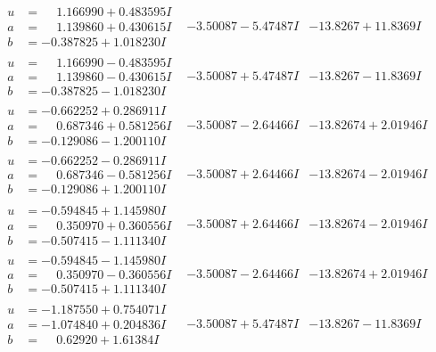 \documentclass[1p]{elsarticle_modified}
\theoremstyle{definition}
\begin{document}
$$\begin{array}{c|c|c}
\begin{aligned}
u &= \phantom{-}1.166990 + 0.483595 I \\
a &= \phantom{-}1.139860 + 0.430615 I \\
b &= -0.387825 + 1.018230 I\end{aligned}
 & -3.50087 - 5.47487 I & -13.8267 + 11.8369 I \\ \hline\begin{aligned}
u &= \phantom{-}1.166990 - 0.483595 I \\
a &= \phantom{-}1.139860 - 0.430615 I \\
b &= -0.387825 - 1.018230 I\end{aligned}
 & -3.50087 + 5.47487 I & -13.8267 - 11.8369 I \\ \hline\begin{aligned}
u &= -0.662252 + 0.286911 I \\
a &= \phantom{-}0.687346 + 0.581256 I \\
b &= -0.129086 - 1.200110 I\end{aligned}
 & -3.50087 - 2.64466 I & -13.82674 + 2.01946 I \\ \hline\begin{aligned}
u &= -0.662252 - 0.286911 I \\
a &= \phantom{-}0.687346 - 0.581256 I \\
b &= -0.129086 + 1.200110 I\end{aligned}
 & -3.50087 + 2.64466 I & -13.82674 - 2.01946 I \\ \hline\begin{aligned}
u &= -0.594845 + 1.145980 I \\
a &= \phantom{-}0.350970 + 0.360556 I \\
b &= -0.507415 - 1.111340 I\end{aligned}
 & -3.50087 + 2.64466 I & -13.82674 - 2.01946 I \\ \hline\begin{aligned}
u &= -0.594845 - 1.145980 I \\
a &= \phantom{-}0.350970 - 0.360556 I \\
b &= -0.507415 + 1.111340 I\end{aligned}
 & -3.50087 - 2.64466 I & -13.82674 + 2.01946 I \\ \hline\begin{aligned}
u &= -1.187550 + 0.754071 I \\
a &= -1.074840 + 0.204836 I \\
b &= \phantom{-}0.62920 + 1.61384 I\end{aligned}
 & -3.50087 + 5.47487 I & -13.8267 - 11.8369 I \\ \hline\begin{aligned}

\end{aligned}
\end{array}$$
\end{document}
